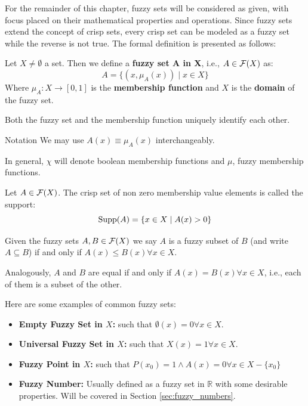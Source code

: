 For the remainder of this chapter, fuzzy sets will be considered as given, with focus placed on their mathematical properties and operations. Since fuzzy sets extend the concept of crisp sets, every crisp set can be modeled as a fuzzy set while the reverse is not true. The formal definition is presented as follows:

\begin{definition}
    Let $X\neq\emptyset$ a set. Then we define a \textbf{fuzzy set A in X}, i.e., $A \in \mathcal{F}(X)$ as:
    \[A=\{(x,\mu_A(x))\mid x\in X\}\]
    Where $\mu_A:X\longrightarrow [0,1]$ is the \textbf{membership function} and $X$ is the \textbf{domain} of the fuzzy set.
\end{definition}

\begin{remark}
     Both the fuzzy set and the membership function uniquely identify each other.
\end{remark}

\begin{notation}{Notation}
    We may use \( A(x) \equiv \mu_A(x) \) interchangeably.

    In general, $\chi$ will denote boolean membership functions and $\mu$, fuzzy membership functions.
\end{notation}



\begin{definition}[Support]
    Let $A \in \mathcal{F}(X)$. The crisp set of non zero membership value elements is called the support:
    \[\textnormal{Supp}(A)=\{x\in X \mid A(x)>0\}\]
\end{definition}

\begin{definition}
    Given the fuzzy sets $A, B \in \mathcal{F}(X)$ we say $A$ is a fuzzy subset of $B$ (and write $A \subseteq B$) if and only if $A(x)
    \leq B(x) \forall x \in X$.

    Analogously, $A$ and $B$ are equal if and only if $A(x)=B(x) \forall x \in X$, i.e., each of them is a subset of the other.
\end{definition}

\begin{example}
    Here are some examples of common fuzzy sets:
    \begin{itemize}
        \item \textbf{Empty Fuzzy Set in $X$:} such that $\emptyset(x)=0 \forall x \in X$.
        \item \textbf{Universal Fuzzy Set in $X$:} such that $X(x)=1  \forall x \in X$.
        \item \textbf{Fuzzy Point in $X$:} such that $P(x_0)=1 \land A(x)=0 \forall x \in X-\{x_0\}$
        \item \textbf{Fuzzy Number:} Usually defined as a fuzzy set in $\mathbb{R}$ with some desirable properties. Will be covered in Section \ref{sec:fuzzy_numbers}.
    \end{itemize}
\end{example}
